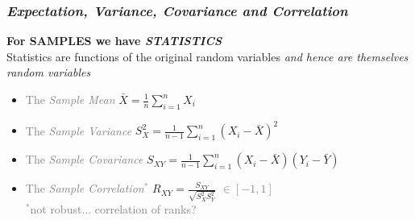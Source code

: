 \documentclass[xcolor={dvipsnames}]{beamer}
\begin{document}
\frame
{
 \frametitle{\emph{Expectation, Variance, Covariance and Correlation}}

\LARGE
\textbf{For SAMPLES we have \emph{STATISTICS}}\\

\vspace{.5em}
\Large
\textcolor{NavyBlue}{Statistics are functions of the original random variables \emph{and hence are themselves random variables}}
\normalsize

\vspace{1.75em}
\begin{itemize}
\item<2-> \textcolor{gray}{The \emph{Sample Mean} } $\displaystyle \bar X = \frac{1}{n}\sum_{i=1}^n X_i$

\item<3->  \textcolor{gray}{The \emph{Sample Variance}}  $\displaystyle S^2_X = \frac{1}{n-1}\sum_{i=1}^n (X_i-\bar X)^2$

\item<4-> \textcolor{gray}{The \emph{Sample Covariance}}  $\displaystyle S_{XY} = \frac{1}{n-1}\sum_{i=1}^n (X_i-\bar X)(Y_i-\bar Y)$

\item<5-> \textcolor{gray}{The \emph{Sample Correlation$^*$}}  $\displaystyle R_{XY} = \frac{S_{XY}}{\sqrt{S_{X}^2S_{Y}^2 }}$  \textcolor{gray}{$\in [-1, 1]$} \\
\scriptsize
\textcolor{gray}{$^*$not robust... correlation of ranks?}
\end{itemize}
}
\end{document}
